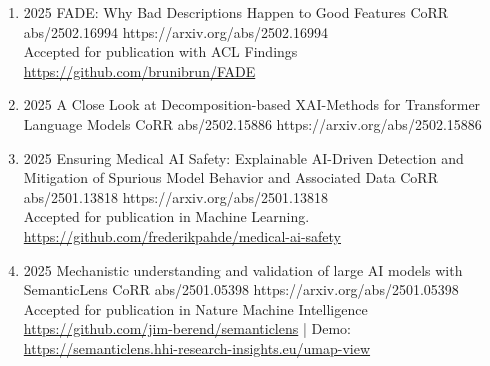 {\begin{enumerate}
        
        \item {}
                        {2025}
                        {FADE: Why Bad Descriptions Happen to Good Features}
                        {CoRR abs/2502.16994}
                        {https://arxiv.org/abs/2502.16994}
                        {
                            \\Accepted for publication with ACL Findings
                            \\\href{https://github.com/brunibrun/FADE}{https://github.com/brunibrun/FADE}
                        }
                        
                        
        \item {}
                        {2025}
                        {A Close Look at Decomposition-based XAI-Methods for Transformer Language Models}
                        {CoRR abs/2502.15886}
                        {https://arxiv.org/abs/2502.15886}

       
        \item {}
                        {2025}
                        {Ensuring Medical AI Safety: Explainable AI-Driven Detection and Mitigation of Spurious Model Behavior and Associated Data}
                        {CoRR abs/2501.13818}
                        {https://arxiv.org/abs/2501.13818}
                        {
                            \\ Accepted for publication in Machine Learning.
                            \\\href{https://github.com/frederikpahde/medical-ai-safety}{https://github.com/frederikpahde/medical-ai-safety}
                        }

        \item {}
                        {2025}
                        {Mechanistic understanding and validation of large AI models with SemanticLens}
                        {CoRR abs/2501.05398}
                        {https://arxiv.org/abs/2501.05398}
                        {   
                            \\ Accepted for publication in Nature Machine Intelligence
                            \\\href{https://github.com/jim-berend/semanticlens}{https://github.com/jim-berend/semanticlens} | Demo: \href{https://semanticlens.hhi-research-insights.eu/umap-view}{https://semanticlens.hhi-research-insights.eu/umap-view}
                        }


\end{enumerate}}

